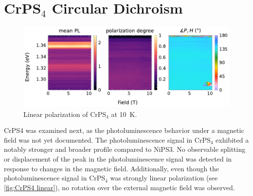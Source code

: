 \documentclass[
	oneside,
	parskip=half,
	a4paper,
]{scrbook}
\begin{document}
\clearpage

\section{CrPS$_4$ Circular Dichroism}
\begin{figure}[b]
	\centering
	\includegraphics{../figures/2024-04-09 CrPS4 linear Polarisation.pdf}
	\caption{Linear polarization of CrPS$_4$ at \SI{10}{K}.}
	\label{fig:CrPS4 linear}
\end{figure}
CrPS4 was examined next, as the photoluminescence behavior under a magnetic field was not yet documented.
The photoluminescence signal in CrPS$_4$ exhibited a notably stronger and broader profile compared to NiPS3.
No observable splitting or displacement of the peak in the photoluminescence signal was detected in response to changes in the magnetic field. 
Additionally, even though the photoluminescence signal in CrPS$_4$ was strongly linear polarization (see \autoref{fig:CrPS4 linear}), no rotation over the external magnetic field was observed.
\end{document}
